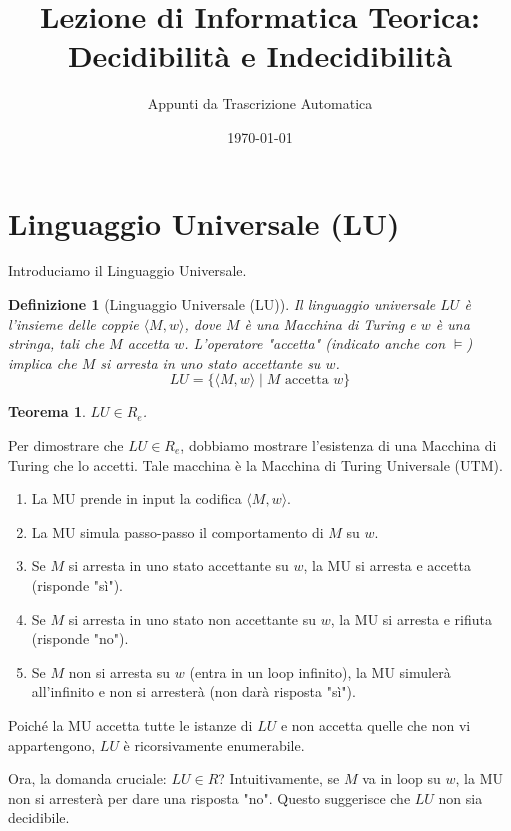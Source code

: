 \documentclass[a4paper]{article}
\title{Lezione di Informatica Teorica: Decidibilità e Indecidibilità}
\author{Appunti da Trascrizione Automatica}
\date{\today}
\makeatletter
\newtheorem{theorem}{Teorema}[section] %
\newtheorem{definition}{Definizione}[section] %
\renewenvironment{proof}[1][\proofname]{\par
  \pushQED{\qed}%
  \normalfont \topsep6\p@\@plus6\p@\relax
  \trivlist
  \item[\hskip\labelsep
        \bfseries
    #1\@addpunct{.}]\ignorespaces
}{%
  \popQED\endtrivlist\@endpefalse
}
\makeatother
\begin{document}
\maketitle
\tableofcontents
\newpage

\section{Linguaggio Universale (LU)}

Introduciamo il Linguaggio Universale.
\begin{definition}[Linguaggio Universale (LU)]
Il linguaggio universale $LU$ è l'insieme delle coppie $\langle M, w \rangle$, dove $M$ è una Macchina di Turing e $w$ è una stringa, tali che $M$ accetta $w$. L'operatore "accetta" (indicato anche con $\models$) implica che $M$ si arresta in uno stato accettante su $w$.
\[ LU = \{ \langle M, w \rangle \mid M \text{ accetta } w \} \]
\end{definition}

\begin{theorem}
$LU \in R_e$.
\end{theorem}
\begin{proof}
Per dimostrare che $LU \in R_e$, dobbiamo mostrare l'esistenza di una Macchina di Turing che lo accetti. Tale macchina è la Macchina di Turing Universale (UTM).
\begin{enumerate}
    \item La MU prende in input la codifica $\langle M, w \rangle$.
    \item La MU simula passo-passo il comportamento di $M$ su $w$.
    \item Se $M$ si arresta in uno stato accettante su $w$, la MU si arresta e accetta (risponde "sì").
    \item Se $M$ si arresta in uno stato non accettante su $w$, la MU si arresta e rifiuta (risponde "no").
    \item Se $M$ non si arresta su $w$ (entra in un loop infinito), la MU simulerà all'infinito e non si arresterà (non darà risposta "sì").
\end{enumerate}
Poiché la MU accetta tutte le istanze di $LU$ e non accetta quelle che non vi appartengono, $LU$ è ricorsivamente enumerabile.
\end{proof}

Ora, la domanda cruciale: $LU \in R$? Intuitivamente, se $M$ va in loop su $w$, la MU non si arresterà per dare una risposta "no". Questo suggerisce che $LU$ non sia decidibile.
\end{document}
